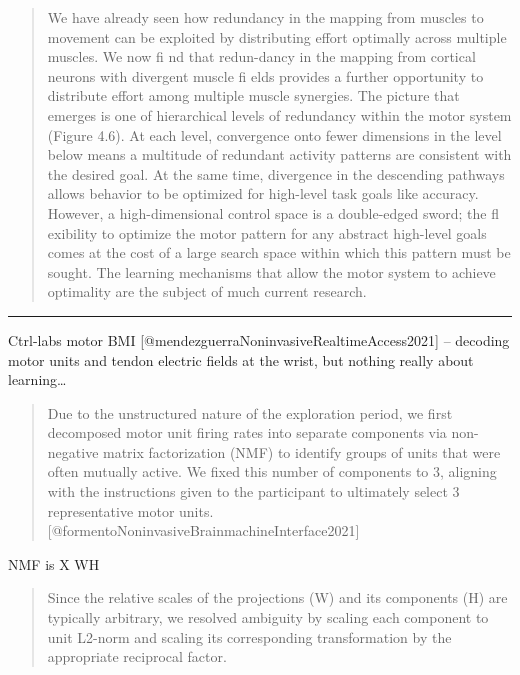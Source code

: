 \begin{quote}
We have already seen how redundancy in the mapping from muscles to
movement can be exploited by distributing effort optimally across
multiple muscles. We now fi nd that redun-dancy in the mapping from
cortical neurons with divergent muscle fi elds provides a further
opportunity to distribute effort among multiple muscle synergies. The
picture that emerges is one of hierarchical levels of redundancy within
the motor system (Figure 4.6). At each level, convergence onto fewer
dimensions in the level below means a multitude of redundant activity
patterns are consistent with the desired goal. At the same time,
divergence in the descending pathways allows behavior to be optimized
for high-level task goals like accuracy. However, a high-dimensional
control space is a double-edged sword; the fl exibility to optimize the
motor pattern for any abstract high-level goals comes at the cost of a
large search space within which this pattern must be sought. The
learning mechanisms that allow the motor system to achieve optimality
are the subject of much current research.
\end{quote}

\begin{quote}
\end{quote}

\begin{center}\rule{0.5\linewidth}{0.5pt}\end{center}

Ctrl-labs motor BMI {[}@mendezguerraNoninvasiveRealtimeAccess2021{]} --
decoding motor units and tendon electric fields at the wrist, but
nothing really about learning\ldots{}

\begin{quote}
Due to the unstructured nature of the exploration period, we first
decomposed motor unit firing rates into separate components via
non-negative matrix factorization (NMF) to identify groups of units that
were often mutually active. We fixed this number of components to 3,
aligning with the instructions given to the participant to ultimately
select 3 representative motor units.
{[}@formentoNoninvasiveBrainmachineInterface2021{]}
\end{quote}

NMF is X \approx WH

\begin{quote}
Since the relative scales of the projections (W) and its components (H)
are typically arbitrary, we resolved ambiguity by scaling each component
to unit L2-norm and scaling its corresponding transformation by the
appropriate reciprocal factor.
\end{quote}

